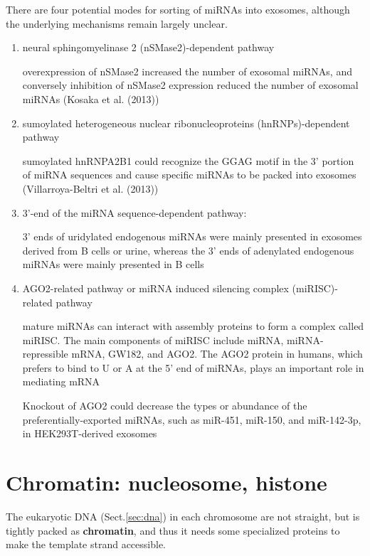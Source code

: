 There are four potential modes for sorting of miRNAs into exosomes, although the
underlying mechanisms remain largely unclear. 
\begin{enumerate}
  \item neural sphingomyelinase 2 (nSMase2)-dependent pathway
  
   overexpression of nSMase2 increased the number of exosomal miRNAs, and
  conversely inhibition of nSMase2 expression reduced the number of exosomal
  miRNAs (Kosaka et al. (2013))
  
  
  \item  sumoylated heterogeneous nuclear ribonucleoproteins (hnRNPs)-dependent
  pathway
  
  sumoylated hnRNPA2B1 could recognize the GGAG motif in the 3' portion of miRNA
  sequences and cause specific miRNAs to be packed into exosomes
  (Villarroya-Beltri et al. (2013))
  
  \item 3'-end of the miRNA sequence-dependent pathway:
  
   3' ends of uridylated endogenous miRNAs were mainly presented in exosomes
  derived from B cells or urine, whereas the 3' ends of adenylated endogenous miRNAs were mainly presented in B cells
  
  \item AGO2-related pathway or miRNA induced silencing complex
  (miRISC)-related pathway
  
   mature miRNAs can interact with assembly proteins to form a complex called
  miRISC.  The main components of miRISC include miRNA, miRNA-repressible mRNA,
  GW182, and AGO2. The AGO2 protein in humans, which prefers to bind to U or A
  at the 5' end of miRNAs, plays an important role in mediating mRNA
  
  Knockout of AGO2 could decrease the types or abundance of the
  preferentially-exported miRNAs, such as miR-451, miR-150, and miR-142-3p, in
  HEK293T-derived exosomes
  
  
\end{enumerate}


\section{Chromatin: nucleosome, histone}
\label{sec:chromatin}
\label{sec:histone}
\label{sec:nucleosome}

The eukaryotic DNA (Sect.\ref{sec:dna}) in each chromosome are not straight, but
is tightly packed as {\bf chromatin}, and thus it needs some specialized
proteins to make the template strand accessible.

